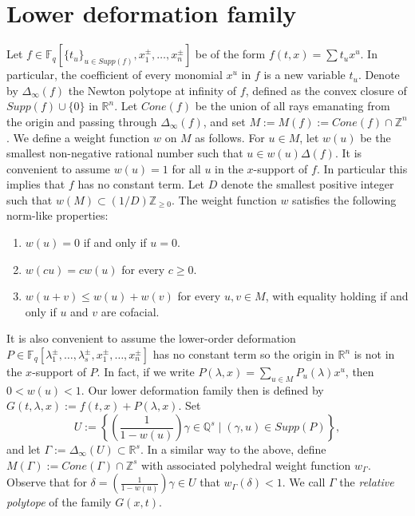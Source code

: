 \documentclass{article}
\theoremstyle{remark}
\def\bb #1{ {\mathbb #1} }
\begin{document}
\section{Lower deformation family}\label{S: unit root formula}

Let $f \in \bb F_q[\{ t_u\}_{u \in Supp(f)}, x_1^\pm, \ldots, x_n^\pm]$ be of the form $f(t, x) = \sum t_u x^u$. In particular, the coefficient of every monomial $x^u$ in $f$ is a new variable $t_u$. Denote by  $\Delta_\infty(f)$ the Newton polytope at infinity of $f$, defined as the convex closure of $Supp(f) \cup \{0\}$ in $\bb R^n$. Let $Cone(f)$ be the union of all rays emanating from the origin and passing through $\Delta_\infty(f)$, and set $M := M(f) := Cone(f) \cap \bb Z^n$. We define a weight function $w$ on $M$ as follows. For $u \in M$, let $w(u)$ be the smallest non-negative rational number such that $u \in w(u) \Delta(f)$. It is convenient to assume $w(u) = 1$ for all $u$ in the $x$-support of $f$. In particular this implies that  $f$ has no constant term. Let $D$ denote the smallest positive integer such that $w(M) \subset (1/D)\bb Z_{\geq 0}$. The weight function $w$ satisfies the following norm-like properties:
\begin{enumerate}
\item $w(u) = 0 $ if and only if $u = 0$.
\item $w(c u) = c w(u)$ for every $c \geq 0$.
\item $w(u + v) \leq w(u) + w(v)$ for every $u, v \in M$, with equality holding if and only if $u$ and $v$ are cofacial.
\end{enumerate}
 It is also convenient to assume the lower-order deformation  $P \in \bb F_q[\lambda_1^\pm, \ldots, \lambda_s^\pm, x_1^\pm, \ldots, x_n^\pm]$ has no constant term so the origin in $\bb {R}^n$ is not in the $x$-support of $P$. In fact, if we write  $P(\lambda, x) = \sum_{u \in M} P_u(\lambda) x^u$, then $0 <w(u) < 1$. Our lower deformation family then is defined by $G(t, \lambda, x) := f(t, x) + P(\lambda, x)$.  Set
\begin{equation}\label{E: RelPolyDef}
U := \left\{ \left( \frac{1}{1 - w(u)} \right) \gamma \in \bb Q^s \mid  (\gamma, u) \in Supp(P) \right\},
\end{equation}
and let $\Gamma := \Delta_\infty(U) \subset \bb R^s$. In a similar way to the above, define $M(\Gamma) := Cone(\Gamma) \cap \bb Z^s$ with associated polyhedral weight function $w_\Gamma$. Observe that for $\delta = \left( \frac{1}{1 - w(u)} \right) \gamma \in U$ that $w_\Gamma(\delta) < 1$.  We call $\Gamma$ the \emph{relative polytope} of the family $G(x, t)$.
\end{document}
